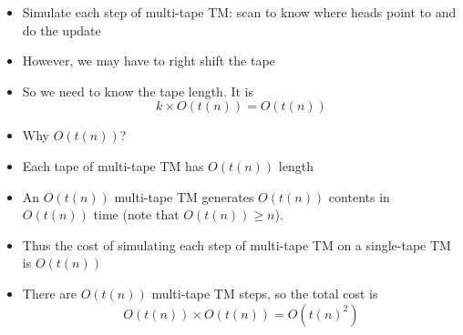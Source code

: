 \begin{frame}[allowframebreaks]
\begin{itemize}
\begin{center}
\end{center}

\item Simulate each step of multi-tape TM: scan to know where heads point to
  and do the update
\item However, we may have to
right shift the tape 
\item So we need to know the tape length. It is
\begin{equation*}
  k \times O(t(n)) = O(t(n)) 
\end{equation*}
\item Why $O(t(n))$?
  
\item Each tape of multi-tape TM has $O(t(n))$ length

\item [] An $O(t(n))$ multi-tape TM generates
$O(t(n))$ contents in 
$O(t(n))$ time (note that $O(t(n))\geq n$).

\item Thus the cost of
  simulating each step of multi-tape TM on a single-tape TM is
  $O(t(n))$
\item There are $O(t(n))$ multi-tape TM steps, so
  the total cost is
  \begin{equation*}
    O(t(n)) \times O(t(n)) = O(t(n)^2)
\end{equation*}
\end{itemize}\end{frame}


